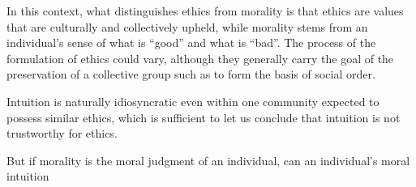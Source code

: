 \documentclass{scrartcl}
\begin{document}
In this context, what distinguishes ethics from morality is that ethics are values that are culturally and collectively upheld, while morality stems from an individual's sense of what is ``good'' and what is ``bad''. The process of the formulation of ethics could vary, although they generally carry the goal of the preservation of a collective group such as to form the basis of social order.

Intuition is naturally idiosyncratic even within one community expected to possess similar ethics, which is sufficient to let us conclude that intuition is not trustworthy for ethics.

But if morality is the moral judgment of an individual, can an individual's moral intuition

\printbibliography
\end{document}
